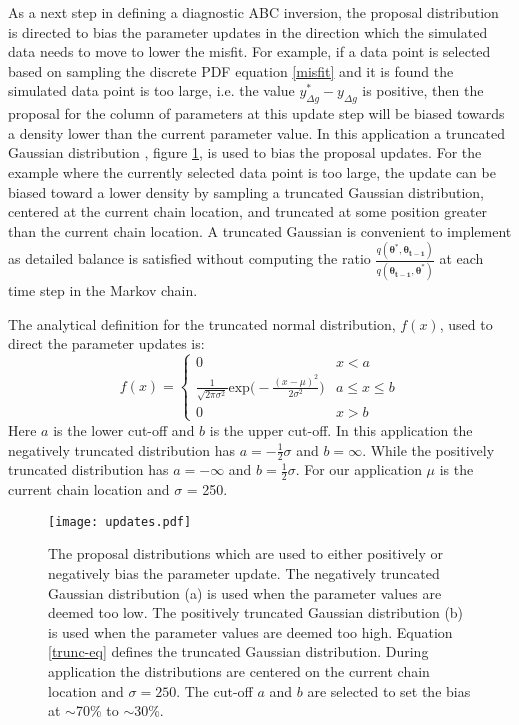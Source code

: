 As a next step in defining a diagnostic ABC inversion, the proposal distribution is directed to bias the parameter updates in the direction which the simulated data needs to move to lower the misfit. For example, if a data point is selected based on sampling the discrete PDF equation \ref{misfit} and it is found the simulated data point is too large, i.e. the value $y^*_{\Delta g} - y_{\Delta g}$ is positive, then the proposal for the column of parameters at this update step will be biased towards a density lower than the current parameter value. In this application a truncated Gaussian distribution , figure \ref{updates}, is used to bias the proposal updates. For the example where the currently selected data point is too large, the update can be biased toward a lower density by sampling a truncated Gaussian distribution, centered at the current chain location, and truncated at some position greater than the current chain location. A truncated Gaussian is convenient to implement as detailed balance is satisfied without computing the ratio $\frac{q(\bm{\theta^*},\bm{\theta_{t-1}})}{q(\bm{\theta_{t-1}},\bm{\theta^*})}$ at each time step in the Markov chain. \par

The analytical definition for the truncated normal distribution, $f(x)$, used to direct the parameter updates is:
\begin{equation}
f(x) = \begin{cases} 
0 & x < a \\
\frac{1}{\sqrt{2\pi\sigma^2}}\text{exp}\Big(-\frac{(x-\mu)^2}{2\sigma^2}\Big) & a\leq x\leq b \\
0 & x > b 
\end{cases}
\label{trunc-eq}
\end{equation}
Here $a$ is the lower cut-off and $b$ is the upper cut-off. In this application the negatively truncated distribution has $a = -\frac{1}{2}\sigma$ and $b = \infty$. While the positively truncated distribution has $a = -\infty$ and $b = \frac{1}{2}\sigma$. For our application $\mu$ is the current chain location and $\sigma$ = 250. \par

\begin{figure}[H]
	\centering
	\texttt{[image: updates.pdf]}
	\caption{The proposal distributions which are used to either positively or negatively bias the parameter update. The negatively truncated Gaussian distribution (a) is used when the parameter values are deemed too low. The positively truncated Gaussian distribution (b) is used when the parameter values are deemed too high. Equation \ref{trunc-eq} defines the truncated Gaussian distribution. During application the distributions are centered on the current chain location and $\sigma = 250$. The cut-off $a$ and $b$ are selected to set the bias at $\sim$70\% to $\sim$30\%.} 
	\label{updates}
\end{figure}


